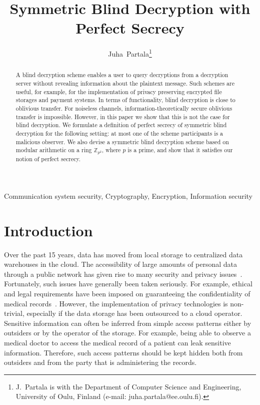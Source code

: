 \documentclass[10pt,journal]{IEEEtran}
\newcommand{\Z}{\mathbb{Z}}
\begin{document}
\title{Symmetric Blind Decryption with Perfect Secrecy}

\author{Juha~Partala\thanks{
J.~Partala is with the Department of Computer Science and Engineering, University of Oulu, Finland (e-mail: juha.partala@ee.oulu.fi).}}



\maketitle

\begin{abstract}
A blind decryption scheme 
enables a user to query decryptions from a decryption server without revealing
information about the plaintext message.
Such schemes are useful, for example, for the implementation of privacy preserving
encrypted file storages and
payment systems. 
In terms of functionality,
blind decryption is close to oblivious transfer.
For noiseless channels, information-theoretically secure oblivious transfer is impossible.
However, in this paper we show that this is not the case for blind decryption.
We formulate a definition of perfect secrecy of symmetric blind decryption for the following setting:
at most one of the scheme participants is a malicious observer.
We also devise a symmetric blind decryption scheme
based on modular arithmetic on a ring $\Z_{p^2}$, where $p$ is a prime,
and show that it satisfies our notion of perfect secrecy.
\end{abstract}

\begin{IEEEkeywords}
Communication system security, Cryptography, Encryption, Information security
\end{IEEEkeywords}





\section{Introduction}

Over the past 15 years, data has moved from local storage to
centralized data warehouses in the cloud.
The 
accessibility
of large amounts of personal data through a public network has given rise to
many security and privacy issues~\cite{Thuraisingham_2015}.
Fortunately, such issues have generally been taken seriously.
For example,
ethical and legal requirements have been imposed on guaranteeing
the confidentiality of medical records~\cite{HIPAA,DataProtDirective}.
However, the implementation of privacy technologies is non-trivial,
especially if the data storage has been outsourced to a cloud operator.
Sensitive information can often be inferred from simple access patterns either
by outsiders or by the operator of the storage.
For example, being able to observe a medical doctor
to access the medical record of a patient can leak sensitive information.
Therefore, such access patterns should be kept hidden both from
outsiders and from the party that is administering the records.
\end{document}
